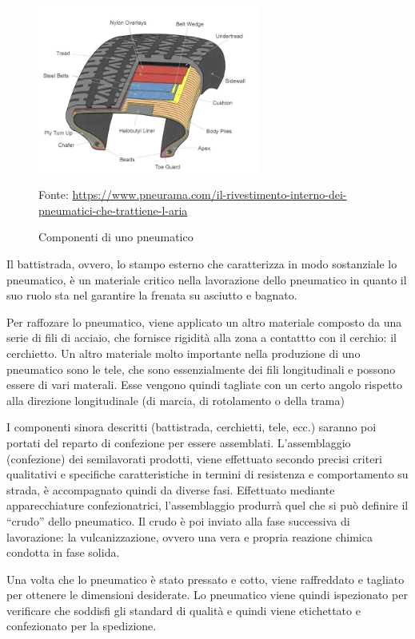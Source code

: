 \begin{figure}[H]
  \centering
  \includegraphics[width=0.65\textwidth]{img/pneumatico.jpg}
  \caption{Componenti di uno pneumatico} 
  Fonte: \url{https://www.pneurama.com/il-rivestimento-interno-dei-pneumatici-che-trattiene-l-aria}
  \label{fig:pneumatico.jpg}
\end{figure}


Il battistrada, ovvero, lo stampo esterno che caratterizza in modo sostanziale lo pneumatico, è un materiale critico nella lavorazione dello pneumatico in quanto il suo ruolo sta nel garantire la frenata su asciutto e bagnato.

Per raffozare lo pneumatico, viene applicato un altro materiale composto da una serie di fili di acciaio, che fornisce rigidità alla zona a contattto con il cerchio: il cerchietto.
Un altro materiale molto importante nella produzione di uno pneumatico sono le tele, che sono essenzialmente dei fili longitudinali e possono essere di vari materali.
Esse vengono quindi tagliate con un certo angolo rispetto alla direzione longitudinale (di marcia, di rotolamento o della trama)

I componenti sinora descritti (battistrada, cerchietti, tele, ecc.) saranno poi portati del reparto di confezione per essere assemblati. 
L'assemblaggio (confezione) dei semilavorati prodotti, viene effettuato secondo precisi criteri qualitativi e specifiche caratteristiche in termini di resistenza e comportamento su strada, è accompagnato quindi da diverse fasi.
Effettuato mediante apparecchiature confezionatrici, l'assemblaggio produrrà quel che si può definire il ``crudo'' dello pneumatico.
Il crudo è poi inviato alla fase successiva di lavorazione: la vulcanizzazione, ovvero una vera e propria reazione chimica condotta in fase solida.

Una volta che lo pneumatico è stato pressato e cotto, viene raffreddato e tagliato per ottenere le dimensioni desiderate. Lo pneumatico viene quindi ispezionato per verificare che soddisfi gli standard di qualità e quindi viene etichettato e confezionato per la spedizione.

